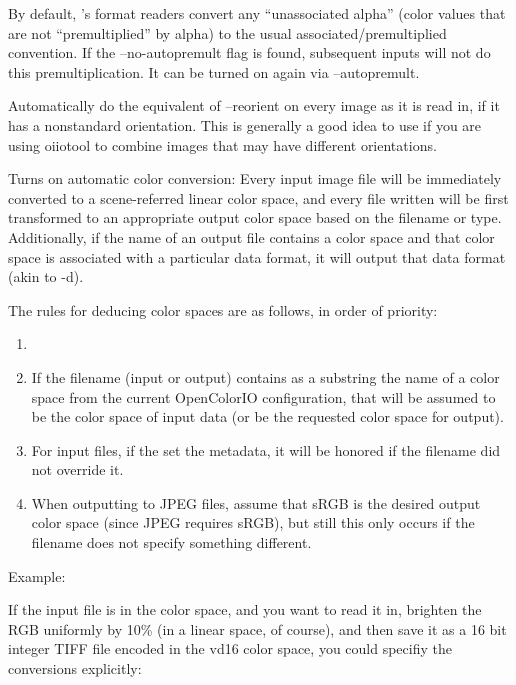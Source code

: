 By default, \product's format readers convert any ``unassociated alpha''
(color values that are not ``premultiplied'' by alpha) to the usual
associated/premultiplied convention.  If the {\cf --no-autopremult}
flag is found, subsequent inputs will not do this premultiplication. It
can be turned on again via {\cf --autopremult}.
\apiend

Automatically do the equivalent of {\cf --reorient} on every image as it is
read in, if it has a nonstandard orientation. This is generally a good idea
to use if you are using oiiotool to combine images that may have different
orientations.
\apiend

Turns on automatic color conversion: Every input image file will be
immediately converted to a scene-referred linear color space, and every file
written will be first transformed to an appropriate output color space based
on the filename or type.   Additionally, if the name of an output file
contains a color space and that color space is associated with a particular
data format, it will output that data format (akin to {\cf -d}).

The rules for deducing color spaces are as follows, in order of priority:

\begin{enumerate}
\item[]
\item If the filename (input or output) contains as a substring the name
  of a color space from the current OpenColorIO configuration, that will
  be assumed to be the color space of input data (or be the requested
  color space for output).
\item For input files, if the \ImageInput set the 
  metadata, it will be honored if the filename did not override it.
\item When outputting to JPEG files, assume that sRGB is the desired
  output color space (since JPEG requires sRGB), but still this only
  occurs if the filename does not specify something different.
\end{enumerate}

\noindent Example:

If the input file  is in the  color space,
and you want to read it in, brighten the RGB uniformly by 10\% (in a linear
space, of course), and then save it as a 16 bit integer TIFF file encoded
in the {\cf vd16} color space, you could specifiy the conversions
explicitly:

